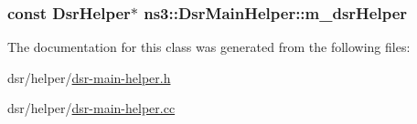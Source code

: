 \subsubsection[{\texorpdfstring{m\+\_\+dsr\+Helper}{m_dsrHelper}}]{\setlength{\rightskip}{0pt plus 5cm}const {\bf Dsr\+Helper}$\ast$ ns3\+::\+Dsr\+Main\+Helper\+::m\+\_\+dsr\+Helper\hspace{0.3cm}{\ttfamily [private]}}\hypertarget{classns3_1_1DsrMainHelper_a39d8c73e413765e00c37d0d6f0efbddd}{}\label{classns3_1_1DsrMainHelper_a39d8c73e413765e00c37d0d6f0efbddd}


The documentation for this class was generated from the following files\+:\begin{DoxyCompactItemize}
\item 
dsr/helper/\hyperlink{dsr-main-helper_8h}{dsr-\/main-\/helper.\+h}\item 
dsr/helper/\hyperlink{dsr-main-helper_8cc}{dsr-\/main-\/helper.\+cc}\end{DoxyCompactItemize}

